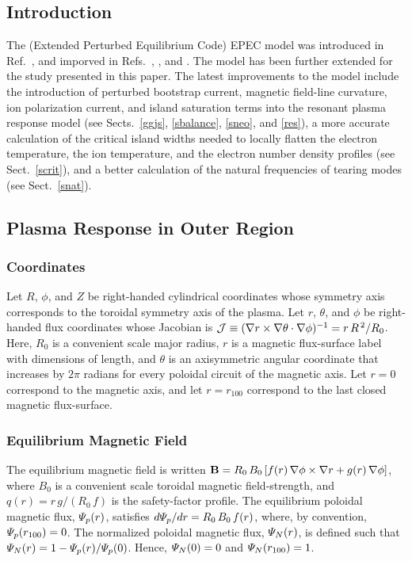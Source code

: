 \documentclass[12pt,prb,aps]{revtex4-1}
\begin{document}
\subsection{Introduction}
The (Extended Perturbed Equilibrium Code) EPEC model was introduced in Ref.~, and imporved  in Refs.~, , and . The model has been further extended for the study
presented in this paper. 
The latest improvements to the model include the introduction of  perturbed bootstrap current, magnetic field-line
curvature, ion polarization current, and island saturation terms into the resonant plasma response model (see Sects.~\ref{ggjs}, \ref{sbalance}, \ref{sneo}, and \ref{res}), a more accurate calculation of the critical island widths needed to
locally flatten the electron temperature, the ion temperature, and the electron number density profiles (see Sect.~\ref{scrit}), 
and a better calculation of the natural frequencies of tearing modes (see Sect.~\ref{snat}). 

\subsection{Plasma Response in Outer Region}
\subsubsection{Coordinates}\label{a1}
Let $R$, $\phi$, and $Z$ be right-handed cylindrical coordinates whose symmetry axis corresponds to
the toroidal symmetry axis of the plasma. Let $r$, $\theta$, and $\phi$ be right-handed flux coordinates
whose Jacobian is ${\cal J}\equiv (\nabla r \times \nabla\theta\cdot\nabla\phi)^{-1}=r\,R^{\,2}/R_0$. 
Here, $R_0$ is a convenient scale major radius, $r$ is a magnetic flux-surface label with dimensions of length,
and $\theta$ is an axisymmetric angular coordinate that increases by $2\pi$ radians for every poloidal circuit of the magnetic axis.
Let $r=0$ correspond to the magnetic axis, and let $r=r_{100}$ correspond to the last closed magnetic flux-surface. 

\subsubsection{Equilibrium Magnetic Field}\label{a2}
The equilibrium magnetic field is written
${\bf B} = R_0\,B_0\left[f(r)\,\nabla\phi\times \nabla r + g(r)\,\nabla\phi\right]$, 
where $B_0$ is a convenient scale toroidal magnetic field-strength, and
$q(r) = r\,g/(R_0\,f)$
is the safety-factor profile.\cite{rftor} The equilibrium poloidal magnetic flux, ${\mit\Psi}_p(r)$,
satisfies $d{\mit\Psi}_p/dr = R_0\,B_0\,f(r)$, where, by convention, ${\mit\Psi}_p(r_{100})=0$. The
normalized poloidal magnetic flux, ${\mit\Psi}_N(r)$, is defined such that
${\mit\Psi}_N(r) = 1-{\mit\Psi}_p(r)/{\mit\Psi}_p(0)$. Hence, ${\mit\Psi}_N(0)=0$ and
${\mit\Psi}_N(r_{100})=1$. 
\end{document}
